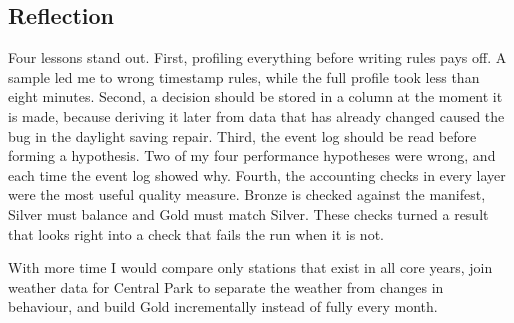 \documentclass[11pt,a4paper]{article}
\begin{document}
\subsection{Reflection}

Four lessons stand out. First, profiling everything before writing rules pays off. A sample led me to wrong timestamp rules,
while the full profile took less than eight minutes. Second, a decision should be stored in a column at the moment it is
made, because deriving it later from data that has already changed caused the bug in the daylight saving repair. Third, the
event log should be read before forming a hypothesis. Two of my four performance hypotheses were wrong, and each time the
event log showed why. Fourth, the accounting checks in every layer were the most useful quality measure. Bronze is checked
against the manifest, Silver must balance and Gold must match Silver. These checks turned a result that looks right into a
check that fails the run when it is not.

With more time I would compare only stations that exist in all core years, join weather data for Central Park to separate
the weather from changes in behaviour, and build Gold incrementally instead of fully every month.
\end{document}
